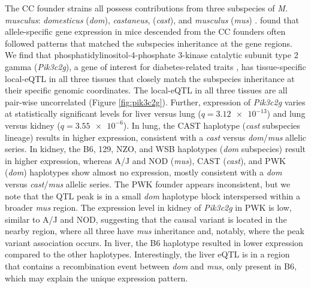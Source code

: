 \documentclass[9pt,twocolumn,twoside]{gsajnl}
\begin{document}
The CC founder strains all possess contributions from three subspecies of \textit{M. musculus}: \textit{domesticus} (\textit{dom}), \textit{castaneus}, (\textit{cast}), and \textit{musculus} (\textit{mus}) \citep{Yang2011}. \cite{Crowley2015} found that allele-specific gene expression in mice descended from the CC founders often followed patterns that matched the subspecies inheritance at the gene regions.
We find that phosphatidylinositol-4-phosphate 3-kinase catalytic subunit type 2 gamma (\textit{Pik3c2g}), a gene of interest for diabetes-related traits \citep{Braccini2015}, has tissue-specific local-eQTL in all three tissues that closely match the subspecies inheritance at their specific genomic coordinates. The local-eQTL in all three tissues are all pair-wise uncorrelated (Figure \ref{fig:pik3c2g}). Further, expression of \textit{Pik3c2g} varies at statistically significant levels for liver versus lung ($q = \num{3.12e-13}$) and lung versus kidney ($q = \num{3.55e-6}$). 
In lung, the CAST haplotype (\textit{cast} subspecies lineage) results in higher expression, consistent with a \textit{cast} versus \textit{dom}/\textit{mus} allelic series. In kidney, the B6, 129, NZO, and WSB haplotypes  (\textit{dom} subspecies) result in higher expression, whereas A/J and NOD (\textit{mus}), CAST (\textit{cast}), and PWK (\textit{dom}) haplotypes show almost no expression, mostly consistent with a \textit{dom} versus \textit{cast}/\textit{mus} allelic series. The PWK founder appears inconsistent, but we note that the QTL peak is in a small \textit{dom} haplotype block interspersed within a broader \textit{mus} region. The expression level in kidney of \textit{Pik3c2g} in PWK is low, similar to A/J and NOD, suggesting that the causal variant is located in the nearby region, where all three have \textit{mus} inheritance and, notably, where the peak variant association occurs. 
In liver, the B6 haplotype resulted in lower expression compared to the other haplotypes. Interestingly, the liver eQTL is in a region that contains a recombination event between \textit{dom} and \textit{mus}, only present in B6, which may explain the unique expression pattern.
\end{document}

